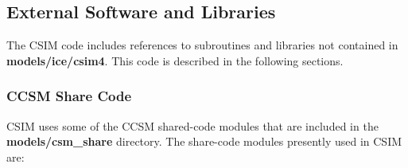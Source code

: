 
\subsection {External Software and Libraries}

The CSIM code includes references to subroutines and libraries not contained in 
{\bf models/ice/csim4}.  This code is described in the following sections.

\subsubsection {CCSM Share Code}

CSIM uses some of the CCSM shared-code modules that are included in the
{\bf models/csm\_share} directory.  The share-code modules presently used in
CSIM are:


